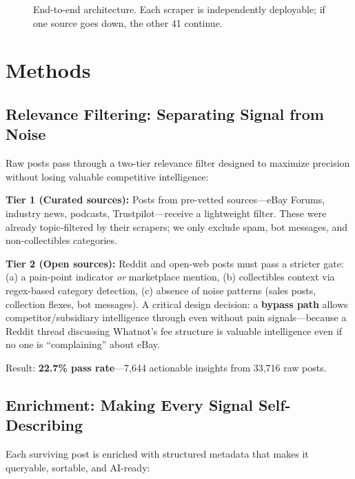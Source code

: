 \documentclass[11pt]{article}
\begin{document}
\begin{figure}[h]
\centering
{}
\caption{End-to-end architecture. Each scraper is independently deployable; if one source goes down, the other 41 continue.}
\label{fig:arch}
\end{figure}

\section{Methods}

\subsection{Relevance Filtering: Separating Signal from Noise}
Raw posts pass through a two-tier relevance filter designed to maximize precision without losing valuable competitive intelligence:

\textbf{Tier 1 (Curated sources):} Posts from pre-vetted sources---eBay Forums, industry news, podcasts, Trustpilot---receive a lightweight filter. These were already topic-filtered by their scrapers; we only exclude spam, bot messages, and non-collectibles categories.

\textbf{Tier 2 (Open sources):} Reddit and open-web posts must pass a stricter gate: (a) a pain-point indicator \textit{or} marketplace mention, (b) collectibles context via regex-based category detection, (c) absence of noise patterns (sales posts, collection flexes, bot messages). A critical design decision: a \textbf{bypass path} allows competitor/subsidiary intelligence through even without pain signals---because a Reddit thread discussing Whatnot's fee structure is valuable intelligence even if no one is ``complaining'' about eBay.

Result: \textbf{22.7\% pass rate}---7,644 actionable insights from 33,716 raw posts.

\subsection{Enrichment: Making Every Signal Self-Describing}
Each surviving post is enriched with structured metadata that makes it queryable, sortable, and AI-ready:
\end{document}
